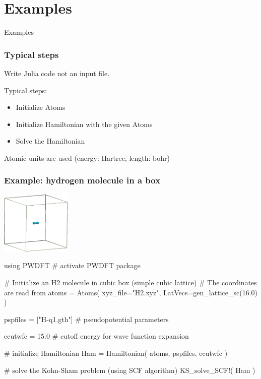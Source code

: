 \section{Examples}

\begin{frame}[plain]
\begin{center}
\Huge{Examples}
\end{center}
\end{frame}

\begin{frame}
\frametitle{Typical steps}

Write Julia code not an input file.

Typical steps:
\begin{itemize}
\item Initialize Atoms
\item Initialize Hamiltonian with the given Atoms
\item Solve the Hamiltonian
\end{itemize}

Atomic units are used (energy: Hartree, length: bohr)

\end{frame}


\begin{frame}[fragile]
\frametitle{Example: hydrogen molecule in a box}

{\centering
\includegraphics[width=0.25\textwidth]{codes/H2/H2.png}

}

\begin{juliacode}
using PWDFT # activate PWDFT package

# Initialize an H2 molecule in cubic box (simple cubic lattice)
# The coordinates are read from
atoms = Atoms( xyz_file="H2.xyz",
               LatVecs=gen_lattice_sc(16.0) )

pspfiles = ["H-q1.gth"] # pseudopotential parameters

ecutwfc = 15.0 # cutoff energy for wave function expansion

# initialize Hamiltonian
Ham = Hamiltonian( atoms, pspfiles, ecutwfc )

# solve the Kohn-Sham problem (using SCF algorithm)
KS_solve_SCF!( Ham )
\end{juliacode}


\end{frame}


